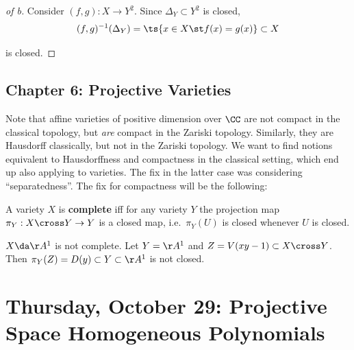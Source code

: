 \begin{proof}[of b]

Consider \((f, g): X\to Y^2\). Since \(\Delta_Y \subset Y^2\) is closed,
\begin{align*}
(f, g)^{-1}(\Delta_Y) = \ts{x\in X \st f(x) = g(x)} \subset X
\end{align*}

is closed.

\end{proof}

\hypertarget{chapter-6-projective-varieties}{%
\subsection{Chapter 6: Projective
Varieties}\label{chapter-6-projective-varieties}}

Note that affine varieties of positive dimension over \(\CC\) are not
compact in the classical topology, but \emph{are} compact in the Zariski
topology. Similarly, they are Hausdorff classically, but not in the
Zariski topology. We want to find notions equivalent to Hausdorffness
and compactness in the classical setting, which end up also applying to
varieties. The fix in the latter case was considering ``separatedness''.
The fix for compactness will be the following:

\begin{definition}[Complete]

A variety \(X\) is \textbf{complete} iff for any variety \(Y\) the
projection map \(\pi_Y:X\cross Y\to Y\) is a closed map,
i.e.~\(\pi_Y(U)\) is closed whenever \(U\) is closed.

\end{definition}

\begin{example}

\(X \da \AA^1\) is not complete. Let \(Y=\AA^1\) and
\(Z = V(xy-1)\subset X\cross Y\). Then
\(\pi_Y(Z) = D(y) \subset Y \subset \AA^1\) is not closed.

\end{example}

\hypertarget{thursday-october-29-projective-space-homogeneous-polynomials}{%
\section{Thursday, October 29: Projective Space Homogeneous
Polynomials}\label{thursday-october-29-projective-space-homogeneous-polynomials}}

